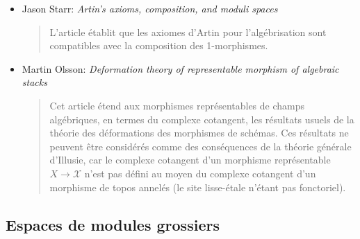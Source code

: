 \begin{itemize}
\begin{quote}
$A$-algèbre noethérienne, l'homomorphisme $A \to B$ est régulier si et seulement
si $B$ est une limite inductive d'$A$-algèbres lisses. On voit aisément que le
théorème de Popescu entraîne le théorème d'approximation d'Artin sur tout schéma
excellent (l'hypothèse d'excellence implique que, pour un anneau local $A$,
l'homomorphisme $A^{\text{h}} \to \hat A$ de l'hensélisé vers le complété est
régulier). L'article utilise le théorème de Popescu pour donner une
généralisation « aux groupoïdes » du théorème principal de \cite{ArtinI},
valable sur tout schéma de base excellent et en tout point $s \in S$.
En particulier, les résultats de \cite{ArtinVersal} valent sur une base
excellente arbitraire. Les auteurs étudient l'unicité locale pour la topologie
étale de l'algébrisation, ainsi que la question de savoir si le groupe des
automorphismes de l'objet agit naturellement sur l'hensélisé de
l'algébrisation.
\end{quote}
\item Jason Starr: \emph{Artin's axioms, composition, and moduli spaces}
\cite{starr_artin}
\begin{quote}
L'article établit que les axiomes d'Artin pour l'algébrisation sont compatibles
avec la composition des 1-morphismes.
\end{quote}
\item Martin Olsson: \emph{Deformation theory of representable
morphism of algebraic stacks} \cite{olsson_deformation}
\begin{quote}
Cet article étend aux morphismes représentables de champs algébriques, en termes
du complexe cotangent, les résultats usuels de la théorie des déformations des
morphismes de schémas. Ces résultats ne peuvent être considérés comme des
conséquences de la théorie générale d'Illusie, car le complexe cotangent d'un
morphisme représentable $X \to \mathcal{X}$ n'est pas
défini au moyen du complexe cotangent d'un morphisme de topos annelés (le
site lisse-étale n'étant pas fonctoriel).
\end{quote}
\end{itemize}

\subsection{Espaces de modules grossiers}
\label{subsection-coarse-moduli-spaces}

